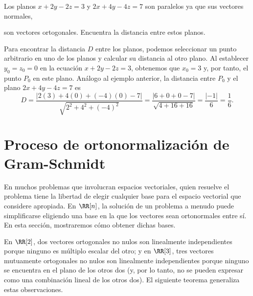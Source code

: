 \begin{examplebox}{}{}
    Los planos $x + 2y - 2z = 3$ y $2x + 4y - 4z = 7$ son paralelos ya que sus vectores normales,
    \begin{matrizn}
    \end{matrizn}
    son vectores ortogonales. Encuentra la distancia entre estos planos.

    \tcblower
    \solucion Para encontrar la distancia $D$ entre los planos, podemos seleccionar un punto arbitrario en uno de los planos y calcular su distancia al otro plano. Al establecer $y_0 = z_0 = 0$ en la ecuación $x + 2y - 2z = 3$, obtenemos que $x_0 = 3$ y, por tanto, el punto $P_0$ en este plano. Análogo al ejemplo anterior, la distancia entre $P_0$ y el plano $2x + 4y - 4z = 7$ es
    $$D = \frac{|2(3) + 4(0) + (-4)(0) - 7|}{\sqrt{2^2 + 4^2 + (-4)^2}} = \frac{|6 + 0 + 0 - 7|}{\sqrt{4 + 16 + 16}} = \frac{|-1|}{6} = \frac{1}{6}.$$
\end{examplebox}

\newpage

\section{Proceso de ortonormalización de Gram-Schmidt}

En muchos problemas que involucran espacios vectoriales, quien resuelve el problema tiene la libertad de elegir cualquier base para el espacio vectorial que considere apropiada. En $\RR[n]$, la solución de un problema a menudo puede simplificarse eligiendo una base en la que los vectores sean ortonormales entre sí. En esta sección, mostraremos cómo obtener dichas bases.

En $\RR[2]$, dos vectores ortogonales no nulos son linealmente independientes porque ninguno es múltiplo escalar del otro; y en $\RR[3]$, tres vectores mutuamente ortogonales no nulos son linealmente independientes porque ninguno se encuentra en el plano de los otros dos (y, por lo tanto, no se pueden expresar como una combinación lineal de los otros dos). El siguiente teorema generaliza estas observaciones.


